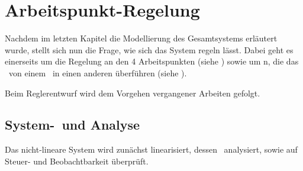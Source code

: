 \chapter{Arbeitspunkt-Regelung}\label{cha:apr}

Nachdem im letzten Kapitel die Modellierung des Gesamtsystems erläutert wurde, stellt sich nun die Frage, wie sich das System regeln lässt. Dabei geht es einerseits um die Regelung an den 4 Arbeitspunkten (siehe ) sowie um \traj n, die das \dpd\ von einem \ap\ in einen anderen überführen (siehe ).

Beim Reglerentwurf wird dem Vorgehen vergangener Arbeiten gefolgt. 


\section{System-\lin\ und Analyse}%

Das nicht-lineare System wird zunächst linearisiert, dessen \ewe\ analysiert, sowie auf Steuer- und Beobachtbarkeit überprüft.

\subsection{\lin}\label{subsec:lin}

